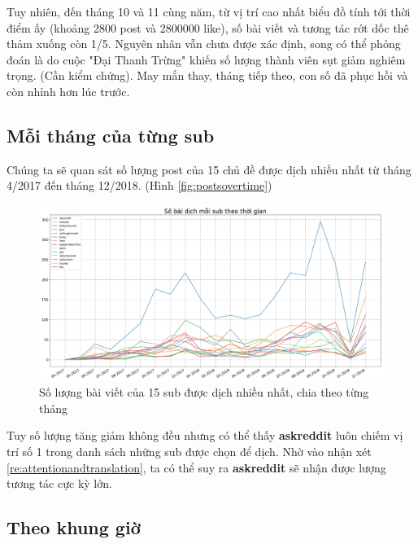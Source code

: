 \documentclass[10pt,a4paper]{article}
\begin{document}
Tuy nhiên, đến tháng 10 và 11 cùng năm, từ vị trí cao nhất biểu đồ tính tới thời điểm ấy (khoảng 2800 post và 2800000 like), số bài viết và tương tác rớt dốc thê thảm xuống còn 1/5. Nguyên nhân vẫn chưa được xác định, song có thể phỏng đoán là do cuộc "Đại Thanh Trừng" khiến số lượng thành viên sụt giảm nghiêm trọng. (Cần kiểm chứng). May mắn thay, tháng tiếp theo, con số đã phục hồi và còn nhỉnh hơn lúc trước.

\subsection{Mỗi tháng của từng sub}
Chúng ta sẽ quan sát số lượng post của 15 chủ đề được dịch nhiều nhất từ tháng 4/2017 đến tháng 12/2018. (Hình \eqref{fig:postsovertime})

\begin{figure}[h]
    \centering
    \includegraphics[width=\textwidth]{img/PostsOverTime.png}
    \caption{Số lượng bài viết của 15 sub được dịch nhiều nhất, chia theo từng tháng}
    \label{fig:postsovertime}
\end{figure}

Tuy số lượng tăng giảm không đều nhưng có thể thấy \textbf{askreddit} luôn chiếm vị trí số 1 trong danh sách những sub được chọn để dịch. Nhờ vào nhận xét \eqref{re:attentionandtranslation}, ta có thể suy ra \textbf{askreddit} sẽ nhận được lượng tương tác cực kỳ lớn.

\subsection{Theo khung giờ}
\end{document}
